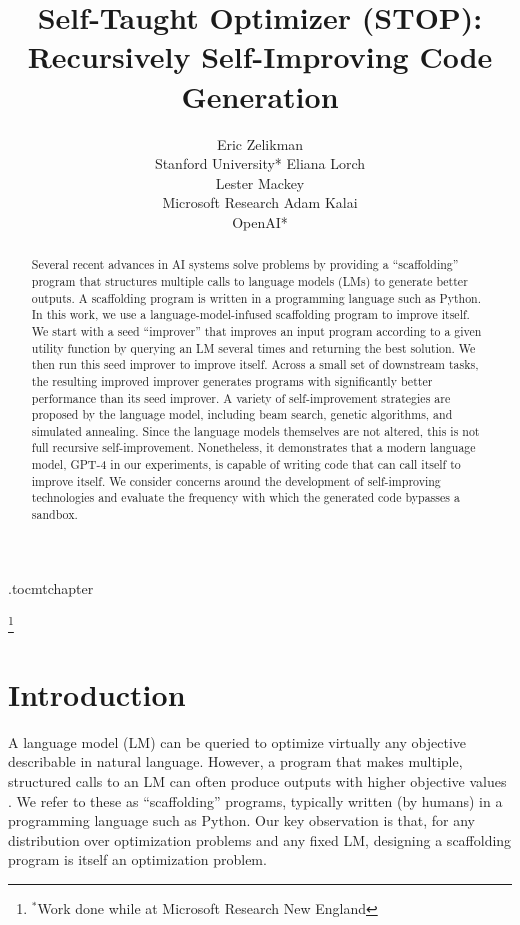 \documentclass{article} %
\title{\textbf{S}elf-\textbf{T}aught \textbf{Op}timizer (\textbf{STOP}): Recursively Self-Improving Code Generation}
\author{Eric Zelikman \\
Stanford University*
\And
Eliana Lorch\\
\And
Lester Mackey\\
Microsoft Research
\And
Adam Kalai\\
OpenAI*
}
\newcommand\blfootnote[1]{%
  \begingroup
  \renewcommand\thefootnote{}\footnote{#1}%
  \addtocounter{footnote}{-1}%
  \endgroup
}
\begin{document}
\maketitle

\etocdepthtag.toc{mtchapter}
%

\begin{abstract}
Several recent advances in AI systems %
solve problems by providing a ``scaffolding'' program that structures multiple calls to language models (LMs) to generate better outputs. A scaffolding program is written in a programming language such as Python. In this work, we use a language-model-infused scaffolding program to improve itself. We start with a seed ``improver'' that improves an input program according to a given utility function by querying an LM several times and returning the best solution. 
We then run this seed improver to improve itself. 
Across a small set of downstream tasks, the resulting improved improver generates programs with significantly better performance than its seed improver. 
A variety of self-improvement strategies are proposed by the language model, including beam search, genetic algorithms, and simulated annealing.
Since the language models themselves are not altered, this is not full recursive self-improvement. Nonetheless, it demonstrates that a modern language model, GPT-4 in our experiments, is capable of writing code that can call itself to improve itself. We consider concerns around the development of self-improving technologies and evaluate the frequency with which the generated code bypasses a sandbox.
\end{abstract}

%

%
%
%
%

\blfootnote{$^*$Work done while at Microsoft Research New England}

\vspace{-3px}
\section{Introduction}
\vspace{-3px}
A language model (LM) can be queried to optimize virtually any objective describable in natural language. 
%
%
However,
a program that makes multiple, structured calls to an LM can often produce outputs with higher objective values \citep{yao2022react,yao2023tree,zelikman2022parsel,chen2022program}. We refer to these as ``scaffolding'' programs, typically written (by humans) in a programming language such as Python.
Our key observation is that, for any distribution over optimization problems and any fixed LM, designing a scaffolding program is itself an optimization problem.
\end{document}
